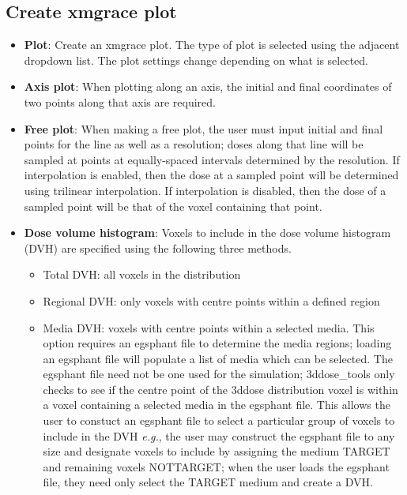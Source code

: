 \documentclass[12pt]{article}
\newcommand{\GUI}{3ddose\_tools}
\newcommand{\eg}{{\it e.g.}, }
\begin{document}
  \subsection{Create xmgrace plot}
  
  \begin{itemize}
  \item{\bf{Plot}}:
  Create an xmgrace plot.  The type of plot is selected using the adjacent dropdown list. The plot settings change depending on what is selected.

  \item{\bf{Axis plot}}:
  When plotting along an axis, the initial and final coordinates of two points along that axis are required.

  \item{\bf{Free plot}}:
  When making a free plot, the user must input initial and final points for the line as well as a resolution; doses along that line will be sampled at points at equally-spaced intervals determined by the resolution.  If interpolation is enabled, then the dose at a sampled point will be determined using trilinear interpolation.  If interpolation is disabled, then the dose of a sampled point will be that of the voxel containing that point.

  \item{\bf{Dose volume histogram}}: Voxels to include in the dose volume histogram (DVH) are specified using the following three methods.
  \begin{itemize}
    \item{Total DVH}: all voxels in the distribution  %
    \item{Regional DVH}: only voxels with centre points within a defined region %
    \item{Media DVH}: voxels with centre points within a selected media. %
This option requires an egsphant file to determine the media regions; loading an egsphant file will populate a list of media which can be selected.  The egsphant file need not be one used for the simulation; \GUI{} only checks to see if the centre point of the 3ddose distribution voxel is within a voxel containing a selected media in the egsphant file.  This allows the user to constuct an egsphant file to select a particular group of voxels to include in the DVH \eg the user may construct the egsphant file to any size and designate voxels to include by assigning the medium TARGET and remaining voxels NOTTARGET; when the user loads the egsphant file, they need only select the TARGET medium and create a DVH.
  \end{itemize}



\end{itemize}
\end{document}
